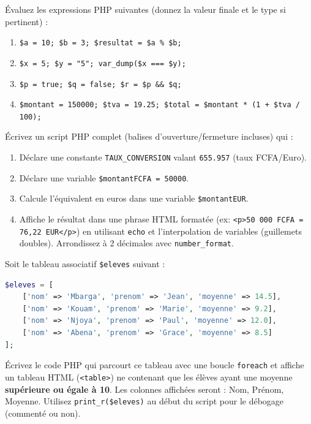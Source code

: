 \documentclass[11pt]{article}
\newcounter{popsec}
\newcounter{popsub}
\newcommand{\courssub}[1]{%
  \stepcounter{popsub}%
  \par\vspace{9pt}\noindent{\popxbold\fontsize{11.5}{13}\selectfont\color{popink}{\color{poporange}\thepopsec.\thepopsub}\hspace{6pt}#1}\par\nopagebreak\vspace{4pt}
}
\begin{document}
\begin{exercice}
Évaluez les expressions PHP suivantes (donnez la valeur finale et le type si pertinent) :
\begin{enumerate}
    \item \texttt{\$a = 10; \$b = 3; \$resultat = \$a \% \$b;}
    \item \texttt{\$x = 5; \$y = "5"; var\_dump(\$x === \$y);}
    \item \texttt{\$p = true; \$q = false; \$r = \$p \&\& \$q;}
    \item \texttt{\$montant = 150000; \$tva = 19.25; \$total = \$montant * (1 + \$tva / 100);}
\end{enumerate}
\end{exercice}

\courssub{Je m'entraîne}

\begin{exercice}
Écrivez un script PHP complet (balises d'ouverture/fermeture incluses) qui :
\begin{enumerate}
    \item Déclare une constante \texttt{TAUX\_CONVERSION} valant \texttt{655.957} (taux FCFA/Euro).
    \item Déclare une variable \texttt{\$montantFCFA = 50000}.
    \item Calcule l'équivalent en euros dans une variable \texttt{\$montantEUR}.
    \item Affiche le résultat dans une phrase HTML formatée (ex: \texttt{<p>50 000 FCFA = 76,22 EUR</p>}) en utilisant \texttt{echo} et l'interpolation de variables (guillemets doubles). Arrondissez à 2 décimales avec \texttt{number\_format}.
\end{enumerate}
\end{exercice}

\begin{exercice}
Soit le tableau associatif \texttt{\$eleves} suivant :
\begin{lstlisting}[language=Php]
$eleves = [
    ['nom' => 'Mbarga', 'prenom' => 'Jean', 'moyenne' => 14.5],
    ['nom' => 'Kouam', 'prenom' => 'Marie', 'moyenne' => 9.2],
    ['nom' => 'Njoya', 'prenom' => 'Paul', 'moyenne' => 12.0],
    ['nom' => 'Abena', 'prenom' => 'Grace', 'moyenne' => 8.5]
];
\end{lstlisting}
Écrivez le code PHP qui parcourt ce tableau avec une boucle \texttt{foreach} et affiche un tableau HTML (\texttt{<table>}) ne contenant que les élèves ayant une moyenne \textbf{supérieure ou égale à 10}. Les colonnes affichées seront : Nom, Prénom, Moyenne. Utilisez \texttt{print\_r(\$eleves)} au début du script pour le débogage (commenté ou non).
\end{exercice}
\end{document}

